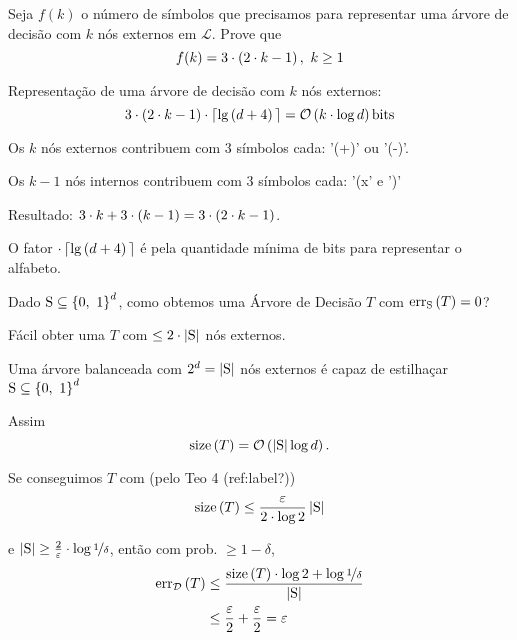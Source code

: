 \begin{exercicio}
  Seja $f(k)$ o número de símbolos que precisamos para representar uma árvore de decisão com $k$ nós externos em $\mathcal{L}$. Prove que
  \[
    f(k) = 3\cdot\left(2\cdot k-1\vphantom{1j}\right),\ k\geq 1
  \]

  Representação de uma árvore de decisão com $k$ nós externos:
  \[
    3\cdot\left(2\cdot k-1\vphantom{1j}\right)\cdot\left\lceil\lg\left(d+4\vphantom{1j}\right)\vphantom{1j}\right\rceil = \mathcal{O}\left(k\cdot\log d\vphantom{1j}\right) \text{bits}
  \]
\end{exercicio}
\begin{resolucao}
  Os $k$ nós externos contribuem com $3$ símbolos cada: '(+)' ou '(-)'.

  Os $k-1$ nós internos contribuem com $3$ símbolos cada: '(x' e ')'

  Resultado: $3\cdot k + 3\cdot\left(k-1\vphantom{1j}\right) = 3\cdot\left(2\cdot k-1\vphantom{1j}\right)$.

  O fator $\cdot\left\lceil\lg\left(d+4\vphantom{1j}\right)\vphantom{1j}\right\rceil$ é pela quantidade mínima de bits para representar o alfabeto.
\end{resolucao}

Dado $\mathrm{S}\subseteq\left\{0,\ 1\vphantom{1j}\right\}^d$, como obtemos uma Árvore de Decisão $T$ com $\mathrm{err}_\mathrm{S}\left(T\vphantom{1j}\right)=0$?

\begin{exercicio}
  Fácil obter uma $T$ com $\leq2\cdot\left|\mathrm{S}\vphantom{1j}\right|$ nós externos.
\end{exercicio}
\begin{resolucao}
  Uma árvore balanceada com $2^d=\left|\mathrm{S}\vphantom{1j}\right|$ nós externos é capaz de estilhaçar $\mathrm{S}\subseteq\left\{0,\ 1\vphantom{1j}\right\}^d$
\end{resolucao}

Assim
\[
  \mathrm{size}\left(T\vphantom{1j}\right) = \mathcal{O}\left(\left|\mathrm{S}\vphantom{1j}\right|\log d\vphantom{1j}\right).
\]

Se conseguimos $T$ com (pelo Teo 4 (ref:label?))
\[
  \mathrm{size}\left(T\vphantom{1j}\right) \leq \frac{\varepsilon}{2\cdot\log 2} \left|\mathrm{S}\vphantom{1j}\right|
\]

e $\left|\mathrm{S}\vphantom{1j}\right|\geq\frac{2}{\varepsilon}\cdot\log\nicefrac{1}{\delta}$, então com prob. $\geq 1-\delta$,
\begin{align}
  \mathrm{err}_\mathcal{D}\left(T\vphantom{1j}\right) &\leq \frac{\mathrm{size}\left(T\vphantom{1j}\right)\cdot\log2 + \log\nicefrac{1}{\delta}}{\left|\mathrm{S}\vphantom{1j}\right|}  \\
                                  &\leq \frac{\varepsilon}{2} + \frac{\varepsilon}{2} = \varepsilon
\end{align}


